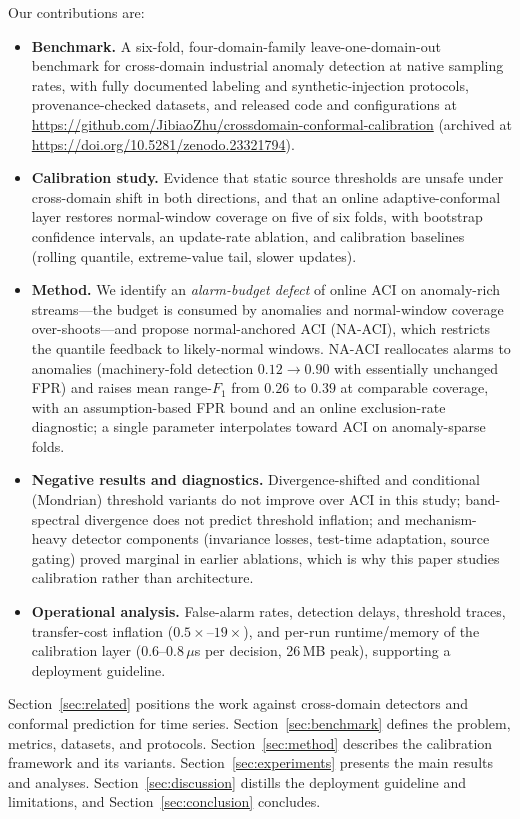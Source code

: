 Our contributions are:
\begin{itemize}
\item \textbf{Benchmark.} A six-fold, four-domain-family leave-one-domain-out benchmark for cross-domain industrial anomaly detection at native sampling rates, with fully documented labeling and synthetic-injection protocols, provenance-checked datasets, and released code and configurations at \url{https://github.com/JibiaoZhu/crossdomain-conformal-calibration} (archived at \url{https://doi.org/10.5281/zenodo.23321794}).
\item \textbf{Calibration study.} Evidence that static source thresholds are unsafe under cross-domain shift in both directions, and that an online adaptive-conformal layer restores normal-window coverage on five of six folds, with bootstrap confidence intervals, an update-rate ablation, and calibration baselines (rolling quantile, extreme-value tail, slower updates).
\item \textbf{Method.} We identify an \emph{alarm-budget defect} of online ACI on anomaly-rich streams---the budget is consumed by anomalies and normal-window coverage over-shoots---and propose normal-anchored ACI (NA-ACI), which restricts the quantile feedback to likely-normal windows. NA-ACI reallocates alarms to anomalies (machinery-fold detection $0.12\!\to\!0.90$ with essentially unchanged FPR) and raises mean range-$F_1$ from $0.26$ to $0.39$ at comparable coverage, with an assumption-based FPR bound and an online exclusion-rate diagnostic; a single parameter interpolates toward ACI on anomaly-sparse folds.
\item \textbf{Negative results and diagnostics.} Divergence-shifted and conditional (Mondrian) threshold variants do not improve over ACI in this study; band-spectral divergence does not predict threshold inflation; and mechanism-heavy detector components (invariance losses, test-time adaptation, source gating) proved marginal in earlier ablations, which is why this paper studies calibration rather than architecture.
\item \textbf{Operational analysis.} False-alarm rates, detection delays, threshold traces, transfer-cost inflation ($0.5\times$--$19\times$), and per-run runtime/memory of the calibration layer ($0.6$--$0.8\,\mu$s per decision, 26\,MB peak), supporting a deployment guideline.
\end{itemize}

Section~\ref{sec:related} positions the work against cross-domain detectors and conformal prediction for time series. Section~\ref{sec:benchmark} defines the problem, metrics, datasets, and protocols. Section~\ref{sec:method} describes the calibration framework and its variants. Section~\ref{sec:experiments} presents the main results and analyses. Section~\ref{sec:discussion} distills the deployment guideline and limitations, and Section~\ref{sec:conclusion} concludes.

